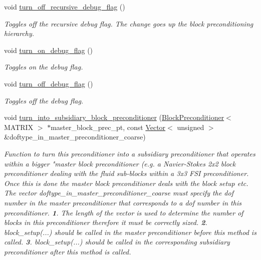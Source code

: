 \begin{DoxyCompactItemize}
void \hyperlink{classoomph_1_1BlockPreconditioner_a8ed741a5fbf514fc29f0a332a211255f}{turn\+\_\+off\+\_\+recursive\+\_\+debug\+\_\+flag} ()
\begin{DoxyCompactList}\small\item\em Toggles off the recursive debug flag. The change goes up the block preconditioning hierarchy. \end{DoxyCompactList}\item 
void \hyperlink{classoomph_1_1BlockPreconditioner_a271bf5ea70579e43797187498d98f9a9}{turn\+\_\+on\+\_\+debug\+\_\+flag} ()
\begin{DoxyCompactList}\small\item\em Toggles on the debug flag. \end{DoxyCompactList}\item 
void \hyperlink{classoomph_1_1BlockPreconditioner_a46c57c6a2f4b54e27d2aaccc4ec90665}{turn\+\_\+off\+\_\+debug\+\_\+flag} ()
\begin{DoxyCompactList}\small\item\em Toggles off the debug flag. \end{DoxyCompactList}\item 
void \hyperlink{classoomph_1_1BlockPreconditioner_ab8e2478caa8370dd12462f17e1cc8082}{turn\+\_\+into\+\_\+subsidiary\+\_\+block\+\_\+preconditioner} (\hyperlink{classoomph_1_1BlockPreconditioner}{Block\+Preconditioner}$<$ M\+A\+T\+R\+IX $>$ $\ast$master\+\_\+block\+\_\+prec\+\_\+pt, const \hyperlink{classoomph_1_1Vector}{Vector}$<$ unsigned $>$ \&doftype\+\_\+in\+\_\+master\+\_\+preconditioner\+\_\+coarse)
\begin{DoxyCompactList}\small\item\em Function to turn this preconditioner into a subsidiary preconditioner that operates within a bigger "master block preconditioner (e.\+g. a Navier-\/\+Stokes 2x2 block preconditioner dealing with the fluid sub-\/blocks within a 3x3 F\+SI preconditioner. Once this is done the master block preconditioner deals with the block setup etc. The vector doftype\+\_\+in\+\_\+master\+\_\+preconditioner\+\_\+coarse must specify the dof number in the master preconditioner that corresponds to a dof number in this preconditioner. {\bfseries 1}. The length of the vector is used to determine the number of blocks in this preconditioner therefore it must be correctly sized. {\bfseries 2}. block\+\_\+setup(...) should be called in the master preconditioner before this method is called. {\bfseries 3}. block\+\_\+setup(...) should be called in the corresponding subsidiary preconditioner after this method is called. \end{DoxyCompactList}\item 

\end{DoxyCompactItemize}

